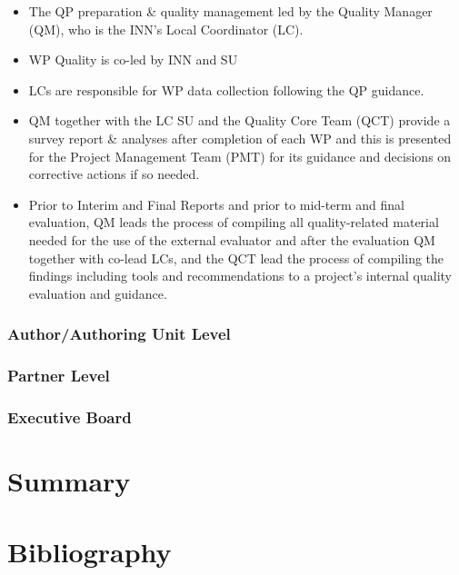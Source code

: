 \documentclass[
  11pt,
]{article}
\begin{document}
\begin{itemize}
\item
  The QP preparation \& quality management led by the Quality Manager
  (QM), who is the INN's Local Coordinator (LC).
\item
  WP Quality is co-led by INN and SU
\item
  LCs are responsible for WP data collection following the QP guidance.
\item
  QM together with the LC SU and the Quality Core Team (QCT) provide a
  survey report \& analyses after completion of each WP and this is
  presented for the Project Management Team (PMT) for its guidance and
  decisions on corrective actions if so needed.
\item
  Prior to Interim and Final Reports and prior to mid-term and final
  evaluation, QM leads the process of compiling all quality-related
  material needed for the use of the external evaluator and after the
  evaluation QM together with co-lead LCs, and the QCT lead the process
  of compiling the findings including tools and recommendations to a
  project's internal quality evaluation and guidance.
\end{itemize}

\hypertarget{authorauthoring-unit-level}{%
\subsubsection{Author/Authoring Unit
Level}\label{authorauthoring-unit-level}}

\hypertarget{partner-level}{%
\subsubsection{Partner Level}\label{partner-level}}

\hypertarget{executive-board}{%
\subsubsection{Executive Board}\label{executive-board}}

\clearpage

\hypertarget{summary}{%
\section{Summary}\label{summary}}

\clearpage

\hypertarget{bibliography}{%
\section{Bibliography}\label{bibliography}}
\end{document}
